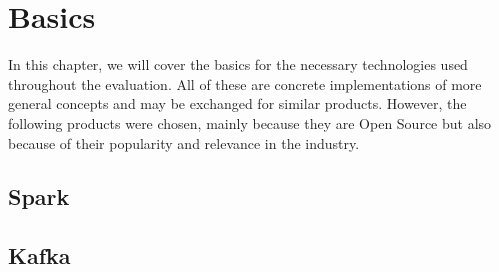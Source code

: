 
\chapter{Basics}

In this chapter, we will cover the basics for the necessary technologies used throughout the evaluation. All of these are concrete implementations of more general concepts and may be exchanged for similar products. However, the following products were chosen, mainly because they are Open Source
but also because of their popularity and relevance in the industry.




\section{Spark}
\section{Kafka}
